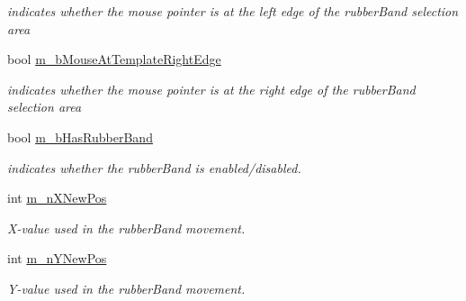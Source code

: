 \begin{CompactItemize}
\begin{CompactList}\small\item\em indicates whether the mouse pointer is at the left edge of the rubberBand selection area \item\end{CompactList}\item 
\hypertarget{classImgLabel_fa3d9dc393d218e31b71f3e34bc79f9c}{
bool \hyperlink{classImgLabel_fa3d9dc393d218e31b71f3e34bc79f9c}{m\_\-bMouseAtTemplateRightEdge}}
\label{classImgLabel_fa3d9dc393d218e31b71f3e34bc79f9c}

\begin{CompactList}\small\item\em indicates whether the mouse pointer is at the right edge of the rubberBand selection area \item\end{CompactList}\item 
\hypertarget{classImgLabel_e9d9356f7e968bd4416d2b875efcf535}{
bool \hyperlink{classImgLabel_e9d9356f7e968bd4416d2b875efcf535}{m\_\-bHasRubberBand}}
\label{classImgLabel_e9d9356f7e968bd4416d2b875efcf535}

\begin{CompactList}\small\item\em indicates whether the rubberBand is enabled/disabled. \item\end{CompactList}\item 
\hypertarget{classImgLabel_8440c20742b16b7b2bdceebe3e9f3302}{
int \hyperlink{classImgLabel_8440c20742b16b7b2bdceebe3e9f3302}{m\_\-nXNewPos}}
\label{classImgLabel_8440c20742b16b7b2bdceebe3e9f3302}

\begin{CompactList}\small\item\em X-value used in the rubberBand movement. \item\end{CompactList}\item 
\hypertarget{classImgLabel_2060dad81295d4e6f87328108f97d15f}{
int \hyperlink{classImgLabel_2060dad81295d4e6f87328108f97d15f}{m\_\-nYNewPos}}
\label{classImgLabel_2060dad81295d4e6f87328108f97d15f}

\begin{CompactList}\small\item\em Y-value used in the rubberBand movement. \item\end{CompactList}\end{CompactItemize}
